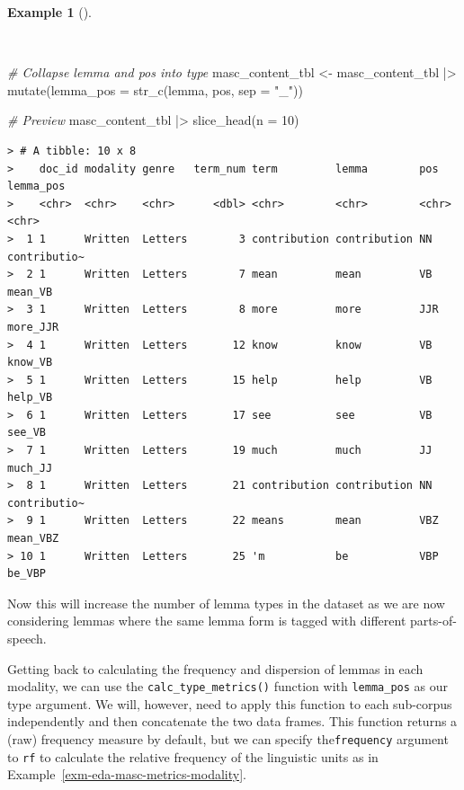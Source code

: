 \documentclass[
  letterpaper,
  DIV=11,
  numbers=noendperiod]{scrreport}
\newenvironment{Shaded}{\begin{snugshade}}{\end{snugshade}}
\newcommand{\AttributeTok}[1]{\textcolor[rgb]{0.00,0.00,0.00}{#1}}
\newcommand{\CommentTok}[1]{\textcolor[rgb]{0.00,0.00,0.00}{\textit{#1}}}
\newcommand{\DecValTok}[1]{\textcolor[rgb]{0.00,0.00,0.00}{#1}}
\newcommand{\FunctionTok}[1]{\textcolor[rgb]{0.00,0.00,0.00}{#1}}
\newcommand{\NormalTok}[1]{\textcolor[rgb]{0.00,0.00,0.00}{#1}}
\newcommand{\OtherTok}[1]{\textcolor[rgb]{0.00,0.00,0.00}{#1}}
\newcommand{\SpecialCharTok}[1]{\textcolor[rgb]{0.00,0.00,0.00}{#1}}
\newcommand{\StringTok}[1]{\textcolor[rgb]{0.00,0.00,0.00}{#1}}
\theoremstyle{definition}
\newtheorem{example}{Example}[chapter]
\theoremstyle{remark}
\begin{document}
\begin{example}[]\protect\hypertarget{exm-eda-masc-type}{}\label{exm-eda-masc-type}

~

\begin{Shaded}
\begin{Highlighting}[]
\CommentTok{\# Collapse lemma and pos into type}
\NormalTok{masc\_content\_tbl }\OtherTok{\textless{}{-}} 
\NormalTok{  masc\_content\_tbl }\SpecialCharTok{|\textgreater{}} 
  \FunctionTok{mutate}\NormalTok{(}\AttributeTok{lemma\_pos =} \FunctionTok{str\_c}\NormalTok{(lemma, pos, }\AttributeTok{sep =} \StringTok{"\_"}\NormalTok{))}

\CommentTok{\# Preview}
\NormalTok{masc\_content\_tbl }\SpecialCharTok{|\textgreater{}} 
  \FunctionTok{slice\_head}\NormalTok{(}\AttributeTok{n =} \DecValTok{10}\NormalTok{)}
\end{Highlighting}
\end{Shaded}

\begin{verbatim}
> # A tibble: 10 x 8
>    doc_id modality genre   term_num term         lemma        pos   lemma_pos   
>    <chr>  <chr>    <chr>      <dbl> <chr>        <chr>        <chr> <chr>       
>  1 1      Written  Letters        3 contribution contribution NN    contributio~
>  2 1      Written  Letters        7 mean         mean         VB    mean_VB     
>  3 1      Written  Letters        8 more         more         JJR   more_JJR    
>  4 1      Written  Letters       12 know         know         VB    know_VB     
>  5 1      Written  Letters       15 help         help         VB    help_VB     
>  6 1      Written  Letters       17 see          see          VB    see_VB      
>  7 1      Written  Letters       19 much         much         JJ    much_JJ     
>  8 1      Written  Letters       21 contribution contribution NN    contributio~
>  9 1      Written  Letters       22 means        mean         VBZ   mean_VBZ    
> 10 1      Written  Letters       25 'm           be           VBP   be_VBP
\end{verbatim}

\end{example}

Now this will increase the number of lemma types in the dataset as we
are now considering lemmas where the same lemma form is tagged with
different parts-of-speech.

Getting back to calculating the frequency and dispersion of lemmas in
each modality, we can use the \texttt{calc\_type\_metrics()} function
with \texttt{lemma\_pos} as our type argument. We will, however, need to
apply this function to each sub-corpus independently and then
concatenate the two data frames. This function returns a (raw) frequency
measure by default, but we can specify the\texttt{frequency} argument to
\texttt{rf} to calculate the relative frequency of the linguistic units
as in Example~\ref{exm-eda-masc-metrics-modality}.
\end{document}
